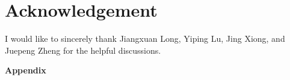 \documentclass[11pt]{article}
\let\citet\citep
\theoremstyle{plain}
\begin{document}
\ifdefined\isarxiv
\section*{Acknowledgement}

I would like to sincerely thank Jiangxuan Long, Yiping Lu, Jing Xiong, and Juepeng Zheng for the helpful discussions. %

\else
\fi


\ifdefined\isarxiv


\else
\newpage



\fi

\newpage
\appendix
\ifdefined\isarxiv\onecolumn\fi


\begin{center}
    {\LARGE \bf Appendix}
\end{center}
{\hypersetup{linkcolor=black}
\tableofcontents
}
\newpage

\ifdefined\isarxiv
\else
\end{document}
